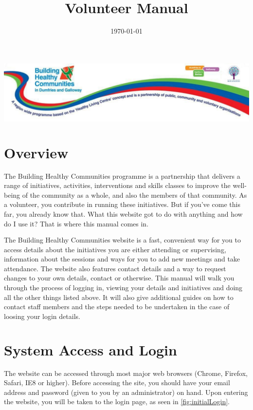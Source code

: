 \documentclass{bhcguides}
\begin{document}
\title{Volunteer Manual}
\includegraphics[width=1.0\textwidth]{BHCbanner.png}
\date{\today}
\maketitle

\tableofcontents

\section{Overview}

The Building Healthy Communities programme is a partnership that delivers a range of initiatives, activities, interventions and skills classes to improve the well-being of the community as a whole, and also the members of that community. As a volunteer, you contribute in running these initiatives. But if you've come this far, you already know that. What this website got to do with anything and how do I use it? That is where this manual comes in.

The Building Healthy Communities website is a fast, convenient way for you to access details about the initiatives you are either attending or supervising, information about the sessions and ways for you to add new meetings and take attendance. The website also features contact details and a way to request changes to your own details, contact or otherwise. This manual will walk you through the process of logging in, viewing your details and initiatives and doing all the other things listed above. It will also give additional guides on how to contact staff members and the steps needed to be undertaken in the case of loosing your login details.

\pagebreak

\section{System Access and Login}
\label{sec:syslogin}

The website can be accessed through most major web browsers (Chrome, Firefox, Safari, IE8 or higher). Before accessing the site, you should have your email address and password (given to you by an administrator) on hand. Upon entering the website, you will be taken to the login page, as seen in \autoref{fig:initialLogin}.
\end{document}
